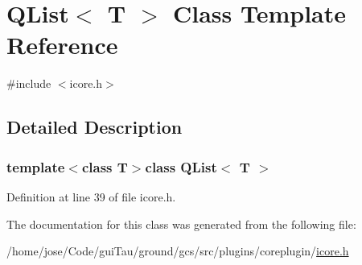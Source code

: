 \hypertarget{class_q_list}{\section{Q\-List$<$ T $>$ Class Template Reference}
\label{class_q_list}
}


{\ttfamily \#include $<$icore.\-h$>$}



\subsection{Detailed Description}
\subsubsection*{template$<$class T$>$class Q\-List$<$ T $>$}



Definition at line 39 of file icore.\-h.



The documentation for this class was generated from the following file\-:\begin{DoxyCompactItemize}
\item 
/home/jose/\-Code/gui\-Tau/ground/gcs/src/plugins/coreplugin/\hyperlink{icore_8h}{icore.\-h}\end{DoxyCompactItemize}
